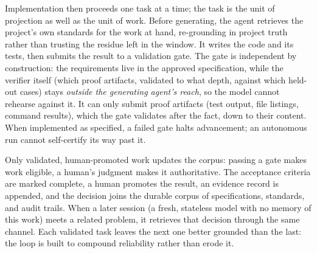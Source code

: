 \documentclass[11pt, a4paper]{article}
\begin{document}
Implementation then proceeds one task at a time; the task is the unit of projection as
well as the unit of work. Before generating, the agent retrieves the
project's own standards for the work at hand, re-grounding in project truth rather than
trusting the residue left in the window. It writes the code and its tests, then submits the
result to a validation gate. The gate is independent by construction: the requirements
live in the approved specification, while the verifier itself
(which proof artifacts, validated to what depth, against which held-out cases) stays
\emph{outside the generating agent's reach}, so the
model cannot rehearse against it. It can only submit proof artifacts (test
output, file listings, command results), which the gate validates after the fact, down
to their content. When implemented as specified, a failed gate halts advancement; an
autonomous run cannot self-certify its way past it.

Only validated, human-promoted work updates the corpus: passing a gate makes work eligible,
a human's judgment makes it authoritative. The acceptance criteria are marked complete, a
human promotes the result, an evidence record is appended, and the decision joins the durable
corpus of specifications, standards, and audit trails. When a later session (a fresh, stateless model with no memory
of this work) meets a related problem, it retrieves that decision through the same channel.
Each validated task leaves the next one better grounded than the last: the loop is built to
compound reliability rather than erode it.
\end{document}
